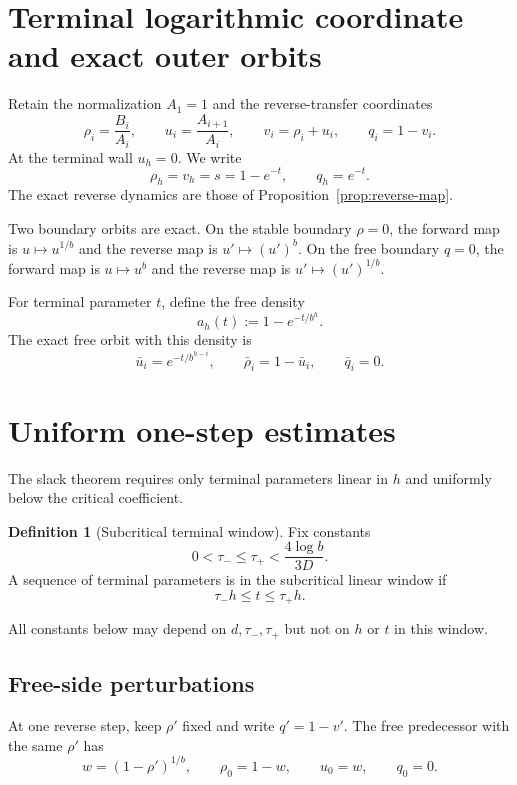 \documentclass[11pt]{amsart}
\theoremstyle{definition}
\newtheorem{definition}[theorem]{Definition}
\begin{document}
\section{Terminal logarithmic coordinate and exact outer orbits}\label{sec:terminal}
Retain the normalization $A_1=1$ and the reverse-transfer coordinates
\[
 \rho_i=\frac{B_i}{A_i},\qquad
 u_i=\frac{A_{i+1}}{A_i},\qquad
 v_i=\rho_i+u_i,\qquad
 q_i=1-v_i.
\]
At the terminal wall $u_h=0$.  We write
\begin{equation}\label{eq:terminal-t}
 \rho_h=v_h=s=1-e^{-t},\qquad q_h=e^{-t}.
\end{equation}
The exact reverse dynamics are those of Proposition~\ref{prop:reverse-map}.

Two boundary orbits are exact.  On the stable boundary $\rho=0$, the forward map is
$u\mapsto u^{1/b}$ and the reverse map is $u'\mapsto (u')^b$.  On the free boundary
$q=0$, the forward map is $u\mapsto u^b$ and the reverse map is
$u'\mapsto (u')^{1/b}$.

For terminal parameter $t$, define the free density
\begin{equation}\label{eq:free-a}
 a_h(t):=1-e^{-t/b^h}.
\end{equation}
The exact free orbit with this density is
\begin{equation}\label{eq:free-orbit}
 \bar u_i=e^{-t/b^{h-i}},\qquad
 \bar\rho_i=1-\bar u_i,\qquad
 \bar q_i=0.
\end{equation}


\section{Uniform one-step estimates}
The slack theorem requires only terminal parameters linear in $h$ and uniformly below the critical coefficient.

\begin{definition}[Subcritical terminal window]\label{def:terminal-window}
Fix constants
\[
 0<\tau_-\le\tau_+<\frac{4\log b}{3D}.
\]
A sequence of terminal parameters is in the subcritical linear window if
\[
 \tau_-h\le t\le\tau_+h.
\]
\end{definition}

All constants below may depend on $d,\tau_-,\tau_+$ but not on $h$ or $t$ in this window.

\subsection{Free-side perturbations}
At one reverse step, keep $\rho'$ fixed and write $q'=1-v'$.  The free predecessor with the same $\rho'$ has
\[
 w=(1-\rho')^{1/b},
 \qquad
 \rho_0=1-w,
 \qquad
 u_0=w,
 \qquad
 q_0=0.
\]
\end{document}
